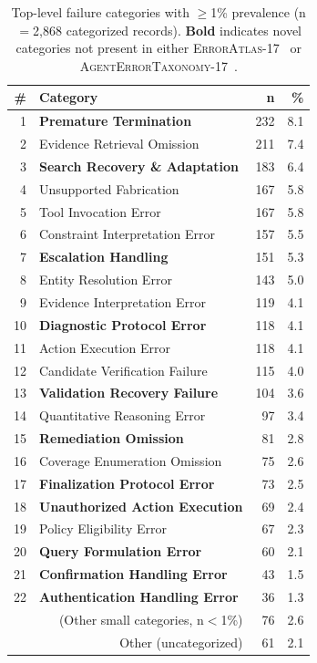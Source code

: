 \documentclass[11pt]{article}
\begin{document}
\begin{table}[h]
\centering
\small
\caption{Top-level failure categories with $\geq$1\% prevalence
(n$=$2{,}868 categorized records). \textbf{Bold} indicates novel
categories not present in either
\textsc{ErrorAtlas}-17~\cite{ashury2026errormap} or
\textsc{AgentErrorTaxonomy}-17~\cite{liu2025agentdebug}.}
\label{tab:prevalence}
\begin{tabular}{rlrr}
\toprule
\# & Category & n & \% \\
\midrule
1 & \textbf{Premature Termination}        & 232 & 8.1 \\
2 & Evidence Retrieval Omission           & 211 & 7.4 \\
3 & \textbf{Search Recovery \& Adaptation}& 183 & 6.4 \\
4 & Unsupported Fabrication               & 167 & 5.8 \\
5 & Tool Invocation Error                 & 167 & 5.8 \\
6 & Constraint Interpretation Error       & 157 & 5.5 \\
7 & \textbf{Escalation Handling}          & 151 & 5.3 \\
8 & Entity Resolution Error               & 143 & 5.0 \\
9 & Evidence Interpretation Error         & 119 & 4.1 \\
10 & \textbf{Diagnostic Protocol Error}    & 118 & 4.1 \\
11 & Action Execution Error                & 118 & 4.1 \\
12 & Candidate Verification Failure        & 115 & 4.0 \\
13 & \textbf{Validation Recovery Failure}  & 104 & 3.6 \\
14 & Quantitative Reasoning Error          & 97  & 3.4 \\
15 & \textbf{Remediation Omission}         & 81  & 2.8 \\
16 & Coverage Enumeration Omission         & 75  & 2.6 \\
17 & \textbf{Finalization Protocol Error}  & 73  & 2.5 \\
18 & \textbf{Unauthorized Action Execution}& 69  & 2.4 \\
19 & Policy Eligibility Error              & 67  & 2.3 \\
20 & \textbf{Query Formulation Error}      & 60  & 2.1 \\
21 & \textbf{Confirmation Handling Error}  & 43  & 1.5 \\
22 & \textbf{Authentication Handling Error}& 36  & 1.3 \\
\midrule
\multicolumn{2}{r}{(Other small categories, n$<$1\%)} & 76 & 2.6 \\
\multicolumn{2}{r}{Other (uncategorized)} & 61 & 2.1 \\
\bottomrule
\end{tabular}
\end{table}
\end{document}
